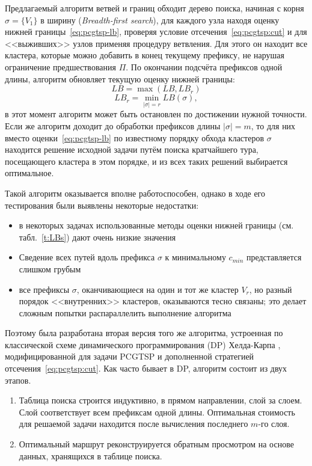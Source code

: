 Предлагаемый алгоритм ветвей и границ обходит дерево поиска,
начиная с корня
$\sigma=\{V_1\}$
в ширину
({\it Breadth-first search}),
для каждого узла
находя оценку нижней границы~\eqref{eq:pcgtsp-lb},
проверяя условие отсечения~\eqref{eq:pcgtsp:cut}
и для <<выживших>> узлов применяя процедуру ветвления.
Для этого он находит все кластера,
которые можно добавить в конец текущему префиксу,
не нарушая ограничение предшествования $\Pi$.
По окончании подсчёта префиксов одной длины,
алгоритм обновляет текущую оценку нижней границы:
$$
LB = \max(LB, LB_r)
$$
$$
LB_r = \min_{|\sigma|=r} LB(\sigma),
$$
в этот момент алгоритм может быть остановлен
по достижении нужной точности.
Если же алгоритм доходит до обработки
префиксов длины
$|\sigma|=m$,
то для них вместо оценки~\eqref{eq:pcgtsp-lb}
по известному порядку обхода кластеров $\sigma$
находится решение исходной задачи путём поиска кратчайшего тура,
посещающего кластера в этом порядке,
и из всех таких решений выбирается оптимальное.

Такой алгоритм оказывается вполне работоспособен,
однако в ходе его тестирования были выявлены некоторые недостатки:
\begin{itemize}
    \item
    в некоторых задачах использованные методы
    оценки нижней границы
    (см. табл.~\ref{t:LBs})
    дают очень низкие значения
    \item
    Сведение всех путей вдоль префикса $\sigma$
    к минимальному $c_{min}$
    представляется слишком грубым
    \item
    все префиксы $\sigma$,
    оканчивающиеся на один и тот же
    кластер $V_r$,
    но разный порядок <<внутренних>> кластеров,
    оказываются тесно связаны;
    это делает сложным попытки распараллелить
    выполнение алгоритма
\end{itemize}

Поэтому была разработана вторая версия того же алгоритма,
устроенная по классической схеме
динамического программирования (DP)
Хелда-Карпа
\autocite{HeldKarp1962},
модифицированной для задачи PCGTSP
и дополненной стратегией отсечения~\eqref{eq:pcgtsp:cut}.
Как часто бывает в DP,
алгоритм состоит из двух этапов.
\begin{enumerate}
  \item
  Таблица поиска строится индуктивно,
  в прямом направлении,
  слой за слоем.
  Слой соответствует всем префиксам одной длины.
  Оптимальная стоимость для решаемой задачи
  находится после вычисления последнего $m$-го слоя.
  \item
  Оптимальный маршрут реконструируется обратным просмотром
  на основе данных,
  хранящихся в таблице поиска.
\end{enumerate}

